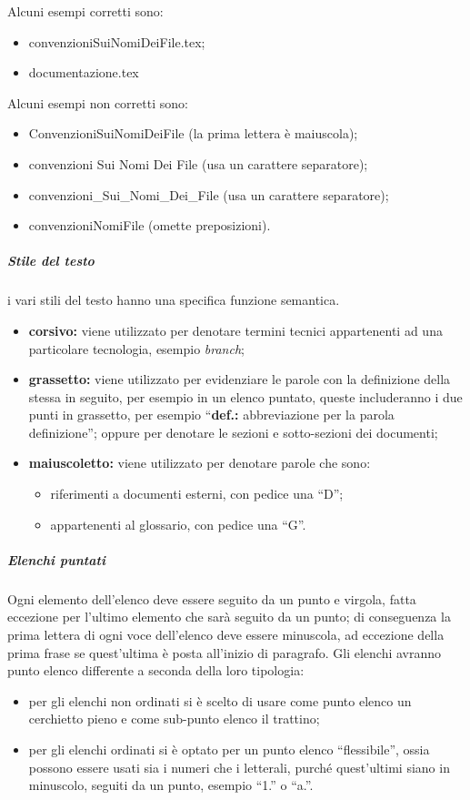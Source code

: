 					Alcuni esempi corretti sono:
					\begin{itemize}
						\item convenzioniSuiNomiDeiFile.tex;
						\item documentazione.tex
					\end{itemize}
					Alcuni esempi non corretti sono:
					\begin{itemize}
						\item ConvenzioniSuiNomiDeiFile (la prima lettera è maiuscola);
						\item convenzioni Sui Nomi Dei File (usa un carattere separatore);
						\item convenzioni\_Sui\_Nomi\_Dei\_File (usa un carattere separatore);
						\item convenzioniNomiFile (omette preposizioni).
					\end{itemize}
				\subparagraph{Stile del testo}
					i vari stili del testo hanno una specifica funzione semantica.
					\begin{itemize}
						\item \textbf{corsivo:} viene utilizzato per denotare termini tecnici appartenenti ad una particolare tecnologia, esempio \textit{branch};
						\item \textbf{grassetto:} viene utilizzato per evidenziare le parole con la definizione della stessa in seguito, per esempio in un elenco puntato, queste includeranno i due punti in grassetto, per esempio ``\textbf{def.:} abbreviazione per la parola definizione''; oppure per denotare le sezioni e sotto-sezioni dei documenti;
						\item \textbf{maiuscoletto:} viene utilizzato per denotare parole che sono:
							\begin{itemize}
								\item riferimenti a documenti esterni, con pedice una ``D'';
								\item appartenenti al glossario, con pedice una ``G''.
							\end{itemize}
					\end{itemize}
				\subparagraph{Elenchi puntati}
					Ogni elemento dell'elenco deve essere seguito da un punto e virgola, fatta eccezione per l'ultimo elemento che sarà seguito da un punto; di conseguenza la prima lettera di ogni voce dell'elenco deve essere minuscola, ad eccezione della prima frase se quest'ultima è posta all'inizio di paragrafo. Gli elenchi avranno punto elenco differente a seconda della loro tipologia:
					\begin{itemize}
						\item per gli elenchi non ordinati si è scelto di usare come punto elenco un cerchietto pieno e come sub-punto elenco il trattino;
						\item per gli elenchi ordinati si è optato per un punto elenco ``flessibile'', ossia possono essere usati sia i numeri che i letterali, purché quest'ultimi siano in minuscolo, seguiti da un punto, esempio ``1.'' o ``a.''.
					\end{itemize}
